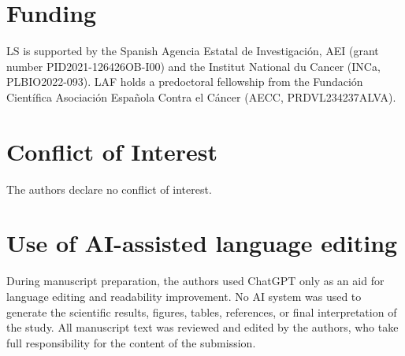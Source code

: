 \documentclass[unnumsec,webpdf,modern,large]{oup-authoring-template}
\begin{document}
\section*{Funding}

LS is supported by the Spanish Agencia Estatal de Investigación, AEI (grant number PID2021-126426OB-I00) and the Institut National du Cancer (INCa, PLBIO2022-093). LAF holds a predoctoral fellowship from the Fundación Científica Asociación Española Contra el Cáncer (AECC, PRDVL234237ALVA). 

\section*{Conflict of Interest}

The authors declare no conflict of interest.

\section*{Use of AI-assisted language editing}

During manuscript preparation, the authors used ChatGPT only as an aid for language editing and readability improvement. No AI system was used to generate the scientific results, figures, tables, references, or final interpretation of the study. All manuscript text was reviewed and edited by the authors, who take full responsibility for the content of the submission.



%


\end{document}
